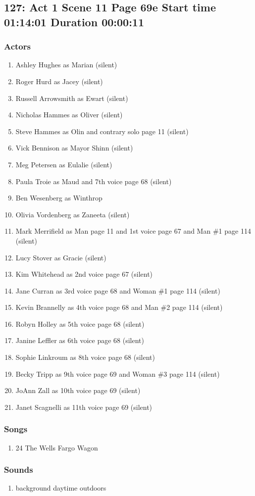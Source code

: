 \subsection{127: Act 1 Scene 11 Page 69e Start time 01:14:01 Duration 00:00:11}

\subsubsection{Actors}
\begin{enumerate}
\item Ashley Hughes as Marian (silent)
\item Roger Hurd as Jacey (silent)
\item Russell Arrowsmith as Ewart (silent)
\item Nicholas Hammes as Oliver (silent)
\item Steve Hammes as Olin and contrary solo page 11 (silent)
\item Vick Bennison as Mayor Shinn (silent)
\item Meg Petersen as Eulalie (silent)
\item Paula Troie as Maud and 7th voice page 68 (silent)
\item Ben Wesenberg as Winthrop
\item Olivia Vordenberg as Zaneeta (silent)
\item Mark Merrifield as Man page 11 and 1st voice page 67 and Man \#1 page 114 (silent)
\item Lucy Stover as Gracie (silent)
\item Kim Whitehead as 2nd voice page 67 (silent)
\item Jane Curran as 3rd voice page 68 and Woman \#1 page 114 (silent)
\item Kevin Brannelly as 4th voice page 68 and Man \#2 page 114 (silent)
\item Robyn Holley as 5th voice page 68 (silent)
\item Janine Leffler as 6th voice page 68 (silent)
\item Sophie Linkroum as 8th voice page 68 (silent)
\item Becky Tripp as 9th voice page 69 and Woman \#3 page 114 (silent)
\item JoAnn Zall as 10th voice page 69 (silent)
\item Janet Scagnelli as 11th voice page 69 (silent)
\end{enumerate}

\subsubsection{Songs}
\begin{enumerate}
\item 24 The Wells Fargo Wagon
\end{enumerate}\subsubsection{Sounds}
\begin{enumerate}
\item background daytime outdoors
\end{enumerate}
